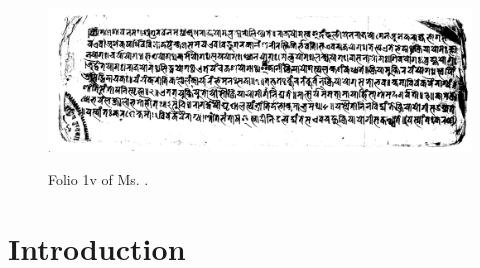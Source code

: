 \newpage

\begin{landscape}
\thispagestyle{empty}
  \begin{figure}[p]
	\centering
  \includegraphics[width=1.5\textwidth]{pics/folio1.jpg}
	\caption{Folio 1v of Ms. .}
	 \label{fig_folio1}
\end{figure}
\end{landscape}

\cleardoublepage
\tableofcontents
\thispagestyle{empty}
\newpage 
\listoffigures
\thispagestyle{empty}
\newpage
\listoftables
\thispagestyle{empty}
\newpage

\mainmatter
\pagestyle{defaultstyle}
\renewcommand{\thetable}{\arabic{table}}
\newpage
\chapter{Introduction}
\cleardoublepage

